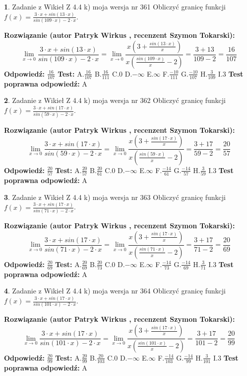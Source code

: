 \documentclass[12pt, a4paper]{article}
\theoremstyle{definition} %
\newtheorem{zad}{}
\newcommand{\zadStart}[1]{\begin{zad}#1\newline}
\newcommand{\zadStop}{\end{zad}}
\newcommand{\rozwStart}[2]{\noindent \textbf{Rozwiązanie (autor #1 , recenzent #2): }\newline}
\newcommand{\rozwStop}{\newline}
\newcommand{\odpStart}{\noindent \textbf{Odpowiedź:}\newline}
\newcommand{\odpStop}{\newline}
\newcommand{\testStart}{\noindent \textbf{Test:}\newline}
\newcommand{\testStop}{\newline}
\newcommand{\kluczStart}{\noindent \textbf{Test poprawna odpowiedź:}\newline}
\newcommand{\kluczStop}{\newline}
\begin{document}
\zadStart{Zadanie z Wikieł Z 4.4 k) moja wersja nr 361}
Obliczyć granicę funkcji $f(x)=\frac{3\cdot x +sin(13\cdot x)}{sin(109\cdot x) -2\cdot x}$.
\zadStop
\rozwStart{Patryk Wirkus}{Szymon Tokarski}
$$\lim\limits_{x\to 0}\frac{3\cdot x +sin(13\cdot x)}{sin(109\cdot x) -2\cdot x}
=\lim\limits_{x\to 0}\frac{x(3+\frac{sin(13\cdot x)}{x})}{x(\frac{sin(109\cdot x)}{x}-2)}
=\frac{3+13}{109-2} = \frac{16}{107}$$
\rozwStop
\odpStart
$\frac{16}{107}$
\odpStop
\testStart
A.$\frac{16}{107}$
B.$\frac{16}{111}$
C.$0$
D.$-\infty$
E.$\infty$
F.$\frac{-10}{111}$
G.$\frac{-10}{107}$
H.$\frac{3}{109}$
I.$3$
\testStop
\kluczStart
A
\kluczStop



\zadStart{Zadanie z Wikieł Z 4.4 k) moja wersja nr 362}
Obliczyć granicę funkcji $f(x)=\frac{3\cdot x +sin(17\cdot x)}{sin(59\cdot x) -2\cdot x}$.
\zadStop
\rozwStart{Patryk Wirkus}{Szymon Tokarski}
$$\lim\limits_{x\to 0}\frac{3\cdot x +sin(17\cdot x)}{sin(59\cdot x) -2\cdot x}
=\lim\limits_{x\to 0}\frac{x(3+\frac{sin(17\cdot x)}{x})}{x(\frac{sin(59\cdot x)}{x}-2)}
=\frac{3+17}{59-2} = \frac{20}{57}$$
\rozwStop
\odpStart
$\frac{20}{57}$
\odpStop
\testStart
A.$\frac{20}{57}$
B.$\frac{20}{61}$
C.$0$
D.$-\infty$
E.$\infty$
F.$\frac{-14}{61}$
G.$\frac{-14}{57}$
H.$\frac{3}{59}$
I.$3$
\testStop
\kluczStart
A
\kluczStop



\zadStart{Zadanie z Wikieł Z 4.4 k) moja wersja nr 363}
Obliczyć granicę funkcji $f(x)=\frac{3\cdot x +sin(17\cdot x)}{sin(71\cdot x) -2\cdot x}$.
\zadStop
\rozwStart{Patryk Wirkus}{Szymon Tokarski}
$$\lim\limits_{x\to 0}\frac{3\cdot x +sin(17\cdot x)}{sin(71\cdot x) -2\cdot x}
=\lim\limits_{x\to 0}\frac{x(3+\frac{sin(17\cdot x)}{x})}{x(\frac{sin(71\cdot x)}{x}-2)}
=\frac{3+17}{71-2} = \frac{20}{69}$$
\rozwStop
\odpStart
$\frac{20}{69}$
\odpStop
\testStart
A.$\frac{20}{69}$
B.$\frac{20}{73}$
C.$0$
D.$-\infty$
E.$\infty$
F.$\frac{-14}{73}$
G.$\frac{-14}{69}$
H.$\frac{3}{71}$
I.$3$
\testStop
\kluczStart
A
\kluczStop



\zadStart{Zadanie z Wikieł Z 4.4 k) moja wersja nr 364}
Obliczyć granicę funkcji $f(x)=\frac{3\cdot x +sin(17\cdot x)}{sin(101\cdot x) -2\cdot x}$.
\zadStop
\rozwStart{Patryk Wirkus}{Szymon Tokarski}
$$\lim\limits_{x\to 0}\frac{3\cdot x +sin(17\cdot x)}{sin(101\cdot x) -2\cdot x}
=\lim\limits_{x\to 0}\frac{x(3+\frac{sin(17\cdot x)}{x})}{x(\frac{sin(101\cdot x)}{x}-2)}
=\frac{3+17}{101-2} = \frac{20}{99}$$
\rozwStop
\odpStart
$\frac{20}{99}$
\odpStop
\testStart
A.$\frac{20}{99}$
B.$\frac{20}{103}$
C.$0$
D.$-\infty$
E.$\infty$
F.$\frac{-14}{103}$
G.$\frac{-14}{99}$
H.$\frac{3}{101}$
I.$3$
\testStop
\kluczStart
A
\kluczStop
\end{document}
